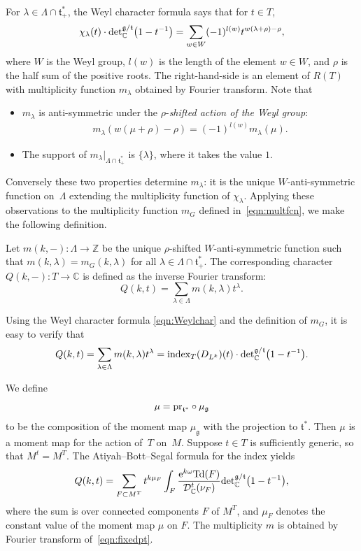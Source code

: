 \documentclass[pdftex]{sigma}
\numberwithin{equation}{section}
\newcommand{\tn}[1]{\textnormal{#1}}
\def\g{\ensuremath{\mathfrak{g}}}
\def\t{\ensuremath{\mathfrak{t}}}
\def\bC{\ensuremath{\mathbb{C}}}
\def\bZ{\ensuremath{\mathbb{Z}}}
\def\pr{\ensuremath{\textnormal{pr}}}
\def\index{\ensuremath{\textnormal{index}}}
\def\Td{\ensuremath{\textnormal{Td}}}
\def\calDC{\ensuremath{\mathcal{D}_{\bC}}}
\def\de{\ensuremath{\tn{det}_\bC}}
\begin{document}
For $\lambda \in \Lambda\cap \t_+^\ast$, the Weyl character formula says that for $t \in T$,
\begin{gather}\label{eqn:Weylchar}
\chi_\lambda(t) \cdot \de^{\g/\t}\big(1-t^{-1}\big)=\sum_{w\in W} (-1)^{l(w)}t^{w(\lambda+\rho)-\rho},
\end{gather}
where $W$ is the Weyl group, $l(w)$ is the length of the element $w \in W$, and $\rho$ is the half sum of the positive roots. The right-hand-side is an element of $R(T)$ with multiplicity function $m_\lambda$ obtained by Fourier transform. Note that
\begin{itemize}\itemsep=0pt
\item $m_\lambda$ is anti-symmetric under the $\rho$-\emph{shifted action of the Weyl group}:
\begin{gather*}%
m_\lambda(w(\mu+\rho)-\rho)=(-1)^{l(w)}m_\lambda(\mu).
\end{gather*}
\item The support of $m_\lambda|_{\Lambda \cap \t_+^\ast}$ is $\{\lambda\}$, where it takes the value $1$.
\end{itemize}
Conversely these two properties determine $m_\lambda$: it is the unique $W$-anti-symmetric function on~$\Lambda$ extending the multiplicity function of $\chi_\lambda$. Applying these observations to the multiplicity function $m_G$ defined in~\eqref{eqn:multfcn}, we make the following definition.
\begin{Definition}Let $m(k,-)\colon \Lambda \rightarrow \bZ$ be the unique $\rho$-shifted $W$-anti-symmetric function such that $m(k,\lambda)=m_G(k,\lambda)$ for all $\lambda \in \Lambda \cap \t_+^\ast$. The corresponding character $Q(k,-) \colon T \rightarrow \bC$ is defined as the inverse Fourier transform:
\[ Q(k,t)=\sum_{\lambda \in \Lambda} m(k,\lambda)t^\lambda.\]
\end{Definition}

Using the Weyl character formula \eqref{eqn:Weylchar} and the definition of $m_G$, it is easy to verify that
\begin{gather*}%
Q(k,t)=\sum_{\lambda \in \Lambda} m(k,\lambda)t^\lambda=\index_T(D_{L^k})(t)\cdot \de^{\g/\t}\big(1-t^{-1}\big).
\end{gather*}

We define
\[ \mu=\pr_{\t^\ast}\circ \mu_\g \]
to be the composition of the moment map $\mu_\g$ with the projection to $\t^\ast$. Then $\mu$ is a moment map for the action of~$T$ on~$M$. Suppose $t\in T$ is sufficiently generic, so that $M^t=M^T$. The Atiyah--Bott--Segal formula for the index yields
\begin{gather}\label{eqn:fixedpt}
Q(k,t)=\sum_{F \subset M^T}t^{k\mu_F}\int_F \frac{{\rm e}^{k\omega}\Td(F)}{\calDC^t(\nu_F)}\de^{\g/\t}\big(1-t^{-1}\big),
\end{gather}
where the sum is over connected components $F$ of $M^T$, and $\mu_F$ denotes the constant value of the moment map $\mu$ on $F$. The multiplicity $m$ is obtained by Fourier transform of~\eqref{eqn:fixedpt}.
\end{document}
